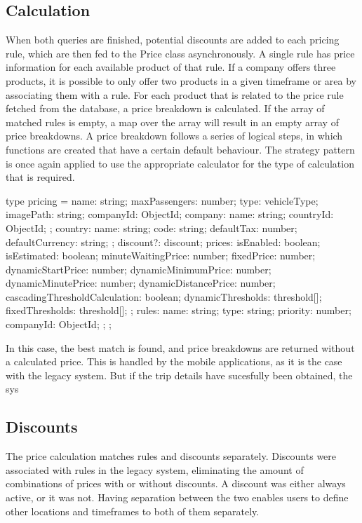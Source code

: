 \subsection{Calculation}
When both queries are finished, potential discounts are added to each pricing rule, which are then fed to the Price class asynchronously. A single rule has price information for each available product of that rule. If a company offers three products, it is possible to only offer two products in a given timeframe or area by associating them with a rule. For each product that is related to the price rule fetched from the database, a price breakdown is calculated. If the array of matched rules is empty, a map over the array will result in an empty array of price breakdowns. A price breakdown follows a series of logical steps, in which functions are created that have a certain default behaviour. The strategy pattern is once again applied to use the appropriate calculator for the type of calculation that is required.


type pricing = {
  name: string;
  maxPassengers: number;
  type: vehicleType;
  imagePath: string;
  companyId: ObjectId;
  company: {
    name: string;
    countryId: ObjectId;
  };
  country: {
    name: string;
    code: string;
    defaultTax: number;
    defaultCurrency: string;
  };
  discount?: discount;
  prices: {
    isEnabled: boolean;
    isEstimated: boolean;
    minuteWaitingPrice: number;
    fixedPrice: number;
    dynamicStartPrice: number;
    dynamicMinimumPrice: number;
    dynamicMinutePrice: number;
    dynamicDistancePrice: number;
    cascadingThresholdCalculation: boolean;
    dynamicThresholds: threshold[];
    fixedThresholds: threshold[];
  };
  rules: {
    name: string;
    type: string;
    priority: number;
    companyId: ObjectId;
  };
};


In this case, the best match is found, and price breakdowns are returned without a calculated price. This is handled by the mobile applications, as it is the case with the legacy system. But if the trip details have sucesfully been obtained, the sys

\subsection{Discounts}
The price calculation matches rules and discounts separately. Discounts were associated with rules in the legacy system, eliminating the amount of combinations of prices with or without discounts. A discount was either always active, or it was not. Having separation between the two enables users to define other locations and timeframes to both of them separately.

